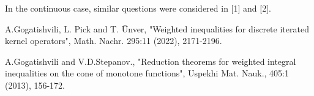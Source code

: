 \documentclass[12pt]{article}
\begin{document}
In the continuous case, similar questions were considered in [1] and [2].

\begin{thebibliography}{00}\label{ref:ref}

A.Gogatishvili, L. Pick and T. \"Unver, "Weighted inequalities for discrete iterated kernel operators", Math. Nachr. 295:11 (2022), 2171-2196.

A.Gogatishvili and V.D.Stepanov., "Reduction theorems for weighted integral inequalities on the cone of monotone functions", Uspekhi Mat. Nauk., 405:1 (2013), 156-172.

\end{thebibliography}
\end{document}
